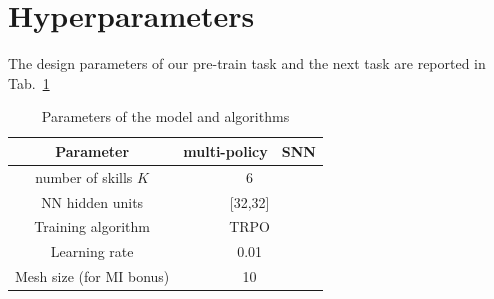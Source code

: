 \documentclass{article} %
\begin{document}



\appendix
\section{Hyperparameters}
The design parameters of our pre-train task and the next task are reported in Tab.\ \ref{tab:params}

\begin{table}[h!]
\centering
\begin{tabular}[t]{c|cc}
Parameter & multi-policy & SNN \\
\hline
number of skills $K$ & \multicolumn{2}{c}{6}\\
NN hidden units & \multicolumn{2}{c}{[32,32]}\\
Training algorithm & \multicolumn{2}{c}{TRPO}\\
Learning rate & \multicolumn{2}{c}{0.01}\\
Mesh size (for MI bonus)& \multicolumn{2}{c}{10}\\
\end{tabular}
\caption{Parameters of the model and algorithms}
\label{tab:params}
\end{table}
\end{document}

